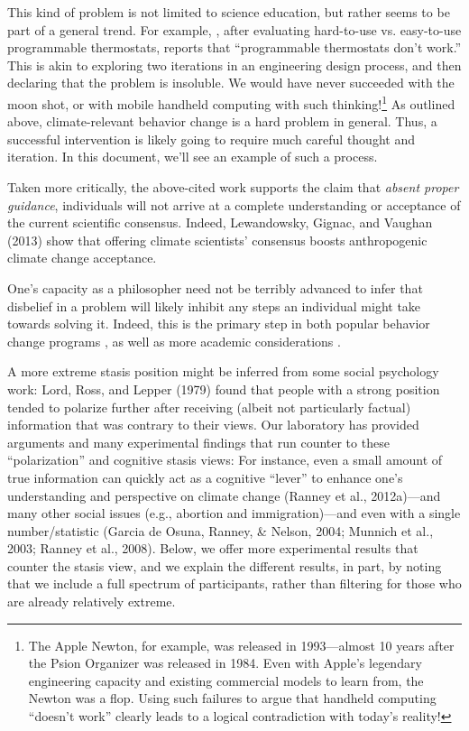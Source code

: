 This kind of problem is not limited to science education, but rather seems to be
part of a general trend. For example, \textcite{fraunhoffer}, after evaluating
hard-to-use vs. easy-to-use programmable thermostats, reports that “programmable
thermostats don't work.” This is akin to exploring two iterations in an
engineering design process, and then declaring that the problem is insoluble. We
would have never succeeded with the moon shot, or with mobile handheld computing
with such thinking!\footnote{The Apple Newton, for example, was released in
    1993---almost 10 years after the Psion Organizer was released in 1984. Even
    with Apple's legendary engineering capacity and existing commercial models
    to learn from, the Newton was a flop. Using such failures to argue that
    handheld computing “doesn't work” clearly leads to a logical contradiction
    with today's reality!}
As outlined above, climate-relevant behavior change is a hard problem in
general.  Thus, a successful intervention is likely going to require much
careful thought and iteration. In this document, we'll see an example of such a
process.

Taken more critically, the above-cited work supports the claim that \emph{absent
proper guidance}, individuals will not arrive at a complete understanding or
acceptance of the current scientific consensus.
Indeed, Lewandowsky, Gignac, and
Vaughan (2013) show that offering climate scientists' consensus boosts
anthropogenic climate change acceptance.

One’s capacity as a philosopher need not be
terribly advanced to infer that disbelief in a problem will likely inhibit any
steps an individual might take towards solving it. Indeed, this is the primary
step in both popular behavior change programs \cite{twelve-step}, as well as
more academic considerations \cite{ELM}.

A more extreme stasis position might be inferred from some social psychology
work: Lord, Ross, and Lepper (1979) found that people with a strong position
tended to polarize further after receiving (albeit not particularly factual)
information that was contrary to their views. Our laboratory has provided
arguments and many experimental findings that run counter to these
``polarization'' and cognitive stasis views: For instance, even a small amount of
true information can quickly act as a cognitive ``lever'' to enhance one's
understanding and perspective on climate change (Ranney et al., 2012a)---and many
other social issues (e.g., abortion and immigration)---and even with a single
number/statistic (Garcia de Osuna, Ranney, \& Nelson, 2004; Munnich et al., 2003;
Ranney et al., 2008). Below, we offer more experimental results that counter the
stasis view, and we explain the different results, in part, by noting that we
include a full spectrum of participants, rather than filtering for those who are
already relatively extreme.

